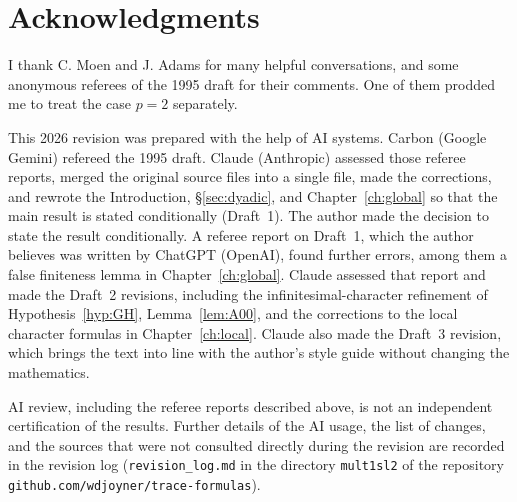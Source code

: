 \documentclass[12pt,letterpaper]{book}
\theoremstyle{plain}
\theoremstyle{definition}
\theoremstyle{remark}
\theoremstyle{remark}
\begin{document}
\chapter*{Acknowledgments}

I thank C. Moen and J. Adams for many helpful conversations,
and some anonymous referees of the 1995 draft for their comments.
One of them prodded me to treat the case $p=2$ separately.

This 2026 revision was prepared with the help of AI systems.
Carbon (Google Gemini) refereed the 1995 draft. Claude (Anthropic)
assessed those referee reports, merged the original source files into a
single file, made the corrections, and rewrote the Introduction,
\S\ref{sec:dyadic}, and Chapter~\ref{ch:global} so that the main result
is stated conditionally (Draft~1). The author made the decision to state
the result conditionally. A referee report on Draft~1, which the author
believes was written by ChatGPT (OpenAI), found further errors, among them
a false finiteness lemma in Chapter~\ref{ch:global}. Claude assessed that
report and made the Draft~2 revisions, including the
infinitesimal-character refinement of Hypothesis~\ref{hyp:GH},
Lemma~\ref{lem:A00}, and the corrections to the local character formulas
in Chapter~\ref{ch:local}. Claude also made the Draft~3 revision, which
brings the text into line with the author's style guide without changing
the mathematics.

AI review, including the referee reports described above, is not an
independent certification of the results. Further details of the AI usage,
the list of changes, and the sources that were not consulted directly
during the revision are recorded in the revision log
(\texttt{revision\_log.md} in the directory \texttt{mult1sl2} of the
repository \texttt{github.com/wdjoyner/trace-formulas}).
\end{document}

